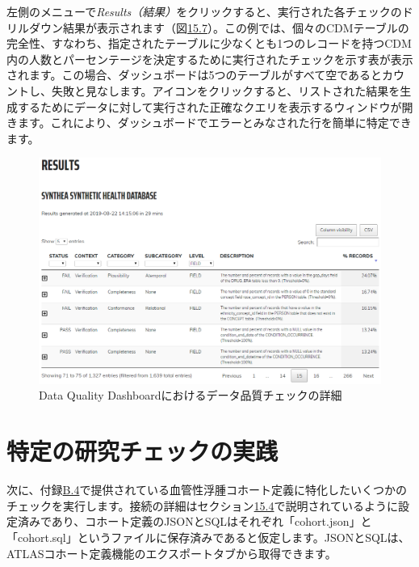 \documentclass[
  11pt]{book}
\theoremstyle{definition}
\theoremstyle{definition}
\theoremstyle{definition}
\theoremstyle{definition}
\theoremstyle{remark}
\begin{document}
左側のメニューで\emph{Results（結果）}をクリックすると、実行された各チェックのドリルダウン結果が表示されます（図\href{https://ohdsi.github.io/TheBookOfOhdsi/DataQuality.html\#fig:dqdResults}{15.7}）。この例では、個々のCDMテーブルの完全性、すなわち、指定されたテーブルに少なくとも1つのレコードを持つCDM内の人数とパーセンテージを決定するために実行されたチェックを示す表が表示されます。この場合、ダッシュボードは5つのテーブルがすべて空であるとカウントし、失敗と見なします。アイコンをクリックすると、リストされた結果を生成するためにデータに対して実行された正確なクエリを表示するウィンドウが開きます。これにより、ダッシュボードでエラーとみなされた行を簡単に特定できます。

\begin{figure}

{\centering \includegraphics[width=1\linewidth]{images/DataQuality/dqdResults} 

}

\caption{Data Quality Dashboardにおけるデータ品質チェックの詳細}\label{fig:dqdResults}
\end{figure}

\section{特定の研究チェックの実践}\label{ux7279ux5b9aux306eux7814ux7a76ux30c1ux30a7ux30c3ux30afux306eux5b9fux8df5}

次に、付録\href{https://ohdsi.github.io/TheBookOfOhdsi/CohortDefinitions.html\#Angioedema}{B.4}で提供されている血管性浮腫コホート定義に特化したいくつかのチェックを実行します。接続の詳細はセクション\href{https://ohdsi.github.io/TheBookOfOhdsi/DataQuality.html\#achillesInPractice}{15.4}で説明されているように設定済みであり、コホート定義のJSONとSQLはそれぞれ「cohort.json」と「cohort.sql」というファイルに保存済みであると仮定します。JSONとSQLは、ATLASコホート定義機能のエクスポートタブから取得できます。
\end{document}
